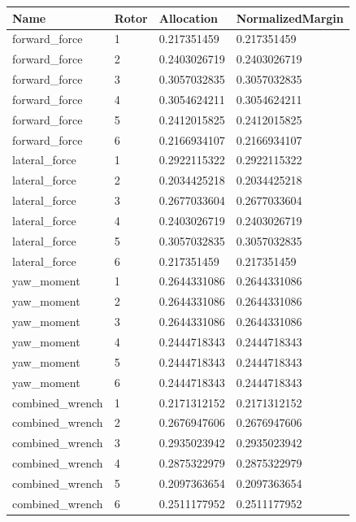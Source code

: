 \begin{tabular}{@{}llll@{}}
\toprule
Name & Rotor & Allocation & NormalizedMargin \\
\midrule
forward\_force & 1 & 0.217351459 & 0.217351459 \\
forward\_force & 2 & 0.2403026719 & 0.2403026719 \\
forward\_force & 3 & 0.3057032835 & 0.3057032835 \\
forward\_force & 4 & 0.3054624211 & 0.3054624211 \\
forward\_force & 5 & 0.2412015825 & 0.2412015825 \\
forward\_force & 6 & 0.2166934107 & 0.2166934107 \\
lateral\_force & 1 & 0.2922115322 & 0.2922115322 \\
lateral\_force & 2 & 0.2034425218 & 0.2034425218 \\
lateral\_force & 3 & 0.2677033604 & 0.2677033604 \\
lateral\_force & 4 & 0.2403026719 & 0.2403026719 \\
lateral\_force & 5 & 0.3057032835 & 0.3057032835 \\
lateral\_force & 6 & 0.217351459 & 0.217351459 \\
yaw\_moment & 1 & 0.2644331086 & 0.2644331086 \\
yaw\_moment & 2 & 0.2644331086 & 0.2644331086 \\
yaw\_moment & 3 & 0.2644331086 & 0.2644331086 \\
yaw\_moment & 4 & 0.2444718343 & 0.2444718343 \\
yaw\_moment & 5 & 0.2444718343 & 0.2444718343 \\
yaw\_moment & 6 & 0.2444718343 & 0.2444718343 \\
combined\_wrench & 1 & 0.2171312152 & 0.2171312152 \\
combined\_wrench & 2 & 0.2676947606 & 0.2676947606 \\
combined\_wrench & 3 & 0.2935023942 & 0.2935023942 \\
combined\_wrench & 4 & 0.2875322979 & 0.2875322979 \\
combined\_wrench & 5 & 0.2097363654 & 0.2097363654 \\
combined\_wrench & 6 & 0.2511177952 & 0.2511177952 \\
\bottomrule
\end{tabular}
